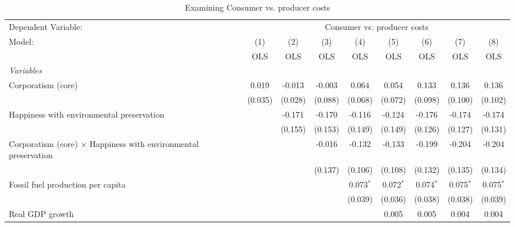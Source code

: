 
\begin{table}[htbp]
   \caption{Examining Consumer vs. producer costs}
   \centering
   \begin{tabular}{lcccccccc}
      \toprule
      Dependent Variable: & \multicolumn{8}{c}{Consumer vs. producer costs}\\
      Model:                                                                 & (1)     & (2)     & (3)     & (4)         & (5)         & (6)         & (7)         & (8)\\  
                                                                             &  OLS    & OLS     & OLS     & OLS         & OLS         & OLS         & OLS         & OLS\\  
      \midrule
      \emph{Variables}\\
      Corporatism (core)                                                     & 0.019   & -0.013  & -0.003  & 0.064       & 0.054       & 0.133       & 0.136       & 0.136\\   
                                                                             & (0.035) & (0.028) & (0.088) & (0.068)     & (0.072)     & (0.098)     & (0.100)     & (0.102)\\   
      Happiness with environmental preservation                              &         & -0.171  & -0.170  & -0.116      & -0.124      & -0.176      & -0.174      & -0.174\\   
                                                                             &         & (0.155) & (0.153) & (0.149)     & (0.149)     & (0.126)     & (0.127)     & (0.131)\\   
      Corporatism (core) $\times$ Happiness with environmental preservation  &         &         & -0.016  & -0.132      & -0.133      & -0.199      & -0.204      & -0.204\\   
                                                                             &         &         & (0.137) & (0.106)     & (0.108)     & (0.132)     & (0.135)     & (0.134)\\   
      Fossil fuel production per capita                                      &         &         &         & 0.073$^{*}$ & 0.072$^{*}$ & 0.074$^{*}$ & 0.075$^{*}$ & 0.075$^{*}$\\   
                                                                             &         &         &         & (0.039)     & (0.036)     & (0.038)     & (0.038)     & (0.039)\\   
      Real GDP growth                                                        &         &         &         &             & 0.005       & 0.005       & 0.004       & 0.004\\   

\end{tabular}
\end{table}
